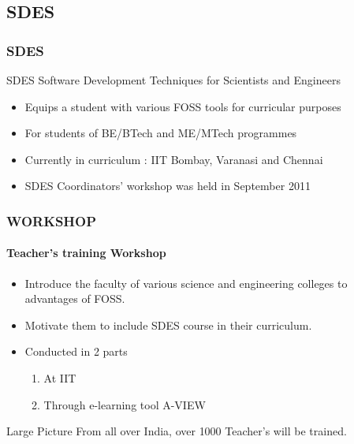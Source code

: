 \documentclass[compress,red]{beamer} %
\begin{document}
\subsection{SDES}
\begin{frame}
\frametitle{SDES}
\begin{block}{SDES}
Software Development Techniques for Scientists and Engineers
\end{block}
\begin{itemize}
\item Equips a student with various FOSS tools for curricular purposes \pause
\item For students of BE/BTech and ME/MTech programmes \pause
\item Currently in curriculum : IIT Bombay, Varanasi and Chennai \pause
\item SDES Coordinators' workshop was held in September 2011 \pause
\end{itemize}
\end{frame}

\begin{frame}
\frametitle{WORKSHOP}
\framesubtitle{Teacher's training Workshop}
\begin{itemize}
\item Introduce the faculty of various science and engineering colleges to advantages of FOSS. \pause
\item Motivate them to include SDES course in their curriculum. \pause
\item Conducted in 2 parts
\begin{enumerate}
\item At IIT \pause
\item Through e-learning tool A-VIEW  \pause
\end{enumerate}
\end{itemize}

\begin{block}{Large Picture}
From all over India, over {\Large 1000} Teacher's will be trained.
\end{block}
\end{frame}
\end{document}
